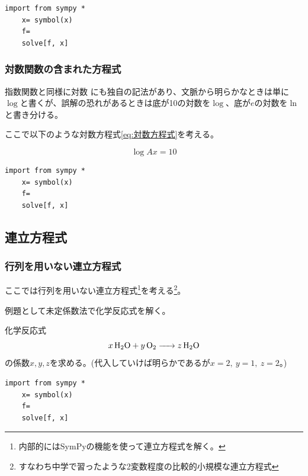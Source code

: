 \documentclass[dvipdfmx, leqno]{jsreport}
\begin{document}
\begin{lstlisting}[caption= {Pythonで指数方程式を解く}, label= {Pythonで指数方程式を解く}]
    import from sympy *
    x= symbol(x)
    f= 
    solve[f, x]
\end{lstlisting}


\subsubsection{対数関数の含まれた方程式}
    指数関数と同様に対数%
    にも独自の記法があり、文脈から明らかなときは単に$\log$と書くが、誤解の恐れがあるときは底が10の対数を$\log$、底が$e$の対数を$\ln$と書き分ける。

    ここで以下のような対数方程式\eqref{eq:対数方程式}を考える。
\begin{tcolorbox}
\begin{equation}\label{eq:対数方程式}
    \log{Ax}= 10
\end{equation}
\end{tcolorbox}

\begin{lstlisting}[caption= {Pythonで対数方程式を解く}, label= {Pythonで対数方程式を解く}]
    import from sympy *
    x= symbol(x)
    f= 
    solve[f, x]
\end{lstlisting}


\subsection{連立方程式}%
\subsubsection{行列を用いない連立方程式}
    ここでは行列を用いない連立方程式\footnote{内部的にはSymPyの機能を使って連立方程式を解く。}を考える\footnote{すなわち中学で習ったような2変数程度の比較的小規模な連立方程式}。

    例題として未定係数法で化学反応式を解く。
\begin{tcolorbox}
    化学反応式
\begin{equation}\label{eq:行列を用いない連立方程式}
    \ce{$x$H2O + $y$O2 -> $z$H2O}
\end{equation}
    の係数$x, y, z$を求める。(代入していけば明らかであるが$x= 2,\ y= 1,\ z= 2$。)
\end{tcolorbox}
\begin{lstlisting}[caption= {Pythonで行列を用いない連立方程式を解く}, label= {Pythonで行列を用いない連立方程式を解く}]
    import from sympy *
    x= symbol(x)
    f= 
    solve[f, x]
\end{lstlisting}
\end{document}
